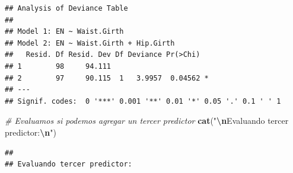 \documentclass[
]{article}
\newenvironment{Shaded}{\begin{snugshade}}{\end{snugshade}}
\newcommand{\AttributeTok}[1]{\textcolor[rgb]{0.13,0.29,0.53}{#1}}
\newcommand{\CommentTok}[1]{\textcolor[rgb]{0.56,0.35,0.01}{\textit{#1}}}
\newcommand{\ControlFlowTok}[1]{\textcolor[rgb]{0.13,0.29,0.53}{\textbf{#1}}}
\newcommand{\FunctionTok}[1]{\textcolor[rgb]{0.13,0.29,0.53}{\textbf{#1}}}
\newcommand{\NormalTok}[1]{#1}
\newcommand{\OtherTok}[1]{\textcolor[rgb]{0.56,0.35,0.01}{#1}}
\newcommand{\SpecialCharTok}[1]{\textcolor[rgb]{0.81,0.36,0.00}{\textbf{#1}}}
\newcommand{\StringTok}[1]{\textcolor[rgb]{0.31,0.60,0.02}{#1}}
\begin{document}
\begin{verbatim}
## Analysis of Deviance Table
## 
## Model 1: EN ~ Waist.Girth
## Model 2: EN ~ Waist.Girth + Hip.Girth
##   Resid. Df Resid. Dev Df Deviance Pr(>Chi)  
## 1        98     94.111                       
## 2        97     90.115  1   3.9957  0.04562 *
## ---
## Signif. codes:  0 '***' 0.001 '**' 0.01 '*' 0.05 '.' 0.1 ' ' 1
\end{verbatim}

\begin{Shaded}
\begin{Highlighting}[]
\CommentTok{\# Evaluamos si podemos agregar un tercer predictor}
\FunctionTok{cat}\NormalTok{(}\StringTok{"}\SpecialCharTok{\textbackslash{}n}\StringTok{Evaluando tercer predictor:}\SpecialCharTok{\textbackslash{}n}\StringTok{"}\NormalTok{)}
\end{Highlighting}
\end{Shaded}

\begin{verbatim}
## 
## Evaluando tercer predictor:
\end{verbatim}

\begin{Shaded}
\end{Shaded}
\end{document}
